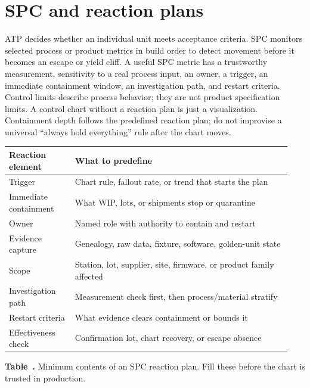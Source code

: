 
\section{SPC and reaction plans}
\label{sec:mfg-spc-ramp}

ATP decides whether an individual unit meets acceptance criteria.
SPC monitors selected process or product metrics in build order to
detect movement before it becomes an escape or yield cliff. A useful SPC metric
has a trustworthy measurement, sensitivity to a real process input, an owner, a
trigger, an immediate containment window, an investigation path, and restart
criteria. Control limits describe process behavior; they are not product
specification limits. A control chart without a reaction plan is just a
visualization. Containment depth follows the predefined reaction plan; do not
improvise a universal ``always hold everything'' rule after the chart moves.

\begin{table}[ht]
\label{tab:mfg-reaction-plan}%
\centering
\setlength{\tabcolsep}{3pt}%
\footnotesize
\renewcommand{\arraystretch}{1.15}%
\begin{tabular}{@{}p{0.22\linewidth}p{0.72\linewidth}@{}}
\toprule
Reaction element & What to predefine \\
\midrule
Trigger & Chart rule, fallout rate, or trend that starts the plan \\
\addlinespace[0.4em]
Immediate containment & What WIP, lots, or shipments stop or quarantine \\
\addlinespace[0.4em]
Owner & Named role with authority to contain and restart \\
\addlinespace[0.4em]
Evidence capture & Genealogy, raw data, fixture, software, golden-unit state \\
\addlinespace[0.4em]
Scope & Station, lot, supplier, site, firmware, or product family affected \\
\addlinespace[0.4em]
Investigation path & Measurement check first, then process/material stratify \\
\addlinespace[0.4em]
Restart criteria & What evidence clears containment or bounds it \\
\addlinespace[0.4em]
Effectiveness check & Confirmation lot, chart recovery, or escape absence \\
\bottomrule
\end{tabular}
\par\medskip
{\raggedright\footnotesize\textbf{Table~\thetable.} Minimum contents of an SPC
reaction plan. Fill these before the chart is trusted in production.\par}
\end{table}
\FloatBarrier

